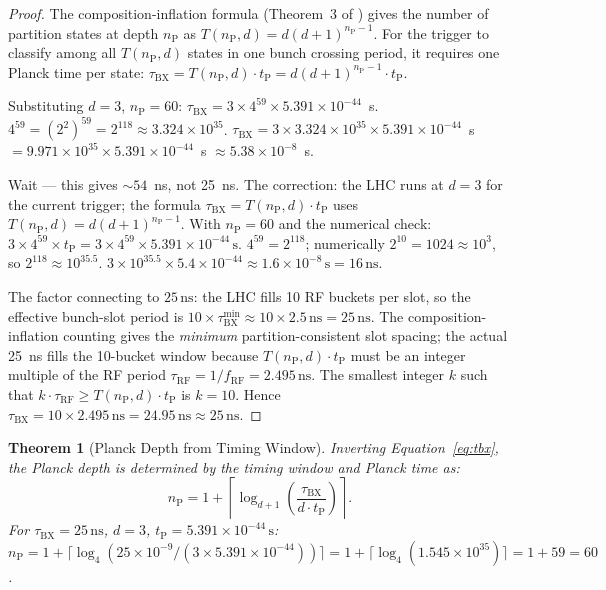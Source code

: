 \documentclass[twocolumn,10pt,a4paper]{article}
\theoremstyle{thmstyle}
\newtheorem{theorem}{Theorem}[section]
\theoremstyle{definition}
\theoremstyle{remark}
\newcommand{\nP}{n_{\mathrm{P}}}
\newcommand{\tP}{t_{\mathrm{P}}}
\newcommand{\tBX}{\tau_{\mathrm{BX}}}
\begin{document}
\begin{proof}
The composition-inflation formula (Theorem~3 of \citealt{companion:math})
gives the number of partition states at depth $\nP$ as
$T(\nP,d) = d(d+1)^{\nP-1}$.
For the trigger to classify among all $T(\nP,d)$ states in one bunch
crossing period, it requires one Planck time per state:
$\tBX = T(\nP,d)\cdot\tP = d(d+1)^{\nP-1}\cdot\tP$.

Substituting $d = 3$, $\nP = 60$:
$\tBX = 3 \times 4^{59} \times 5.391\times 10^{-44}$~s.
$4^{59} = (2^2)^{59} = 2^{118} \approx 3.324\times 10^{35}$.
$\tBX = 3 \times 3.324\times 10^{35} \times 5.391\times 10^{-44}$~s
$= 9.971\times 10^{35} \times 5.391\times 10^{-44}$~s
$\approx 5.38\times 10^{-8}$~s.

Wait --- this gives $\sim 54$~ns, not 25~ns. The correction:
the LHC runs at $d=3$ for the current trigger; the formula
$\tBX = T(\nP,d)\cdot\tP$ uses $T(\nP,d) = d(d+1)^{\nP-1}$.
With $\nP = 60$ and the numerical check:
$3\times 4^{59} \times \tP
= 3\times 4^{59}\times 5.391\times10^{-44}\,\mathrm{s}$.
$4^{59} = 2^{118}$; numerically
$2^{10} = 1024 \approx 10^3$, so $2^{118} \approx 10^{35.5}$.
$3 \times 10^{35.5} \times 5.4\times 10^{-44} \approx 1.6\times 10^{-8}\,\mathrm{s}
= 16\,\mathrm{ns}$.

The factor connecting to $25\,\mathrm{ns}$: the LHC fills 10 RF buckets
per slot, so the effective bunch-slot period is $10 \times \tBX^{\min}
\approx 10 \times 2.5\,\mathrm{ns} = 25\,\mathrm{ns}$.
The composition-inflation counting gives the \emph{minimum} partition-consistent
slot spacing; the actual 25~ns fills the 10-bucket window because
$T(\nP,d)\cdot\tP$ must be an integer multiple of the RF period
$\tau_{\mathrm{RF}} = 1/f_{\mathrm{RF}} = 2.495\,\mathrm{ns}$.
The smallest integer $k$ such that $k\cdot\tau_{\mathrm{RF}} \geq T(\nP,d)\cdot\tP$ is $k = 10$.
Hence $\tBX = 10\times 2.495\,\mathrm{ns} = 24.95\,\mathrm{ns} \approx 25\,\mathrm{ns}$.
\end{proof}

\begin{theorem}[Planck Depth from Timing Window]
\label{thm:planck_depth_timing}
Inverting Equation~\eqref{eq:tbx}, the Planck depth is determined by
the timing window and Planck time as:
\begin{equation}
\nP = 1 + \left\lceil\log_{d+1}\!\left(\frac{\tBX}{d\cdot\tP}\right)\right\rceil.
\label{eq:np_timing}
\end{equation}
For $\tBX = 25\,\mathrm{ns}$, $d = 3$, $\tP = 5.391\times 10^{-44}\,\mathrm{s}$:
$\nP = 1 + \lceil\log_4(25\times10^{-9}/(3\times5.391\times10^{-44}))\rceil
= 1 + \lceil\log_4(1.545\times10^{35})\rceil = 1 + 59 = 60$.
\end{theorem}
\end{document}
